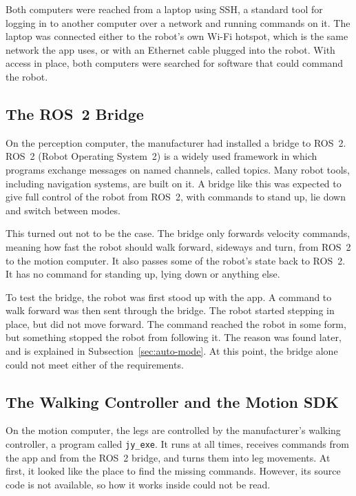 Both computers were reached from a laptop using SSH, a standard tool for logging in to another computer
over a network and running commands on it. The laptop was connected either to the robot's own Wi-Fi
hotspot, which is the same network the app uses, or with an Ethernet cable plugged into the robot. With access in place, both computers were searched for
software that could command the robot.

\subsection{The ROS~2 Bridge}
\label{sec:bridge}

On the perception computer, the manufacturer had installed a bridge to ROS~2. ROS~2 (Robot Operating
System~2) is a widely used framework in which programs exchange messages on named channels, called topics.
Many robot tools, including navigation systems, are built on it. A bridge like this was expected to give
full control of the robot from ROS~2, with commands to stand up, lie down and switch between modes.

This turned out not to be the case. The bridge only forwards velocity commands, meaning how fast the robot
should walk forward, sideways and turn, from ROS~2 to the motion computer. It also passes some of the
robot's state back to ROS~2. It has no command for standing up, lying down or anything else.

To test the bridge, the robot was first stood up with the app. A command to walk forward was then sent
through the bridge. The robot started stepping in place, but did not move forward. The command reached the
robot in some form, but something stopped the robot from following it. The reason was found later, and is
explained in Subsection~\ref{sec:auto-mode}. At this point, the bridge alone could not meet either of the
requirements.

\subsection{The Walking Controller and the Motion SDK}
\label{sec:sdk}

On the motion computer, the legs are controlled by the manufacturer's walking controller, a program called
\texttt{jy\_exe}. It runs at all times, receives commands from the app and from the ROS~2 bridge, and turns
them into leg movements. At first, it looked like the place to find the missing commands. However, its source code is
not available, so how it works inside could not be read.

